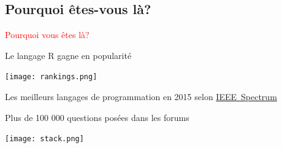 \documentclass[11pt]{beamer}\usepackage[]{graphicx}\usepackage[]{color}
\begin{document}
\subsection{Pourquoi \^{e}tes-vous l\`{a}?}

\begin{frame}
 \begin{center}
  \Huge{\textcolor{red}{Pourquoi vous \^{e}tes l\`{a}?}}
 \end{center}
\end{frame}


\begin{frame}{Le langage R gagne en popularit\'{e}}

\vspace{0.1in}

\begin{center}
\texttt{[image: rankings.png]}
\end{center}

\vspace{0.2in}

Les meilleurs langages de programmation en 2015 selon \href{http://spectrum.ieee.org/computing/software/the-2015-top-ten-programming-languages}{\mbox{IEEE Spectrum}} \\
\end{frame}


\begin{frame}{Plus de 100 000 questions pos\'{e}es dans les forums}

\texttt{[image: stack.png]}
\newline
\vspace{0.1in}
\end{frame}
\end{document}
